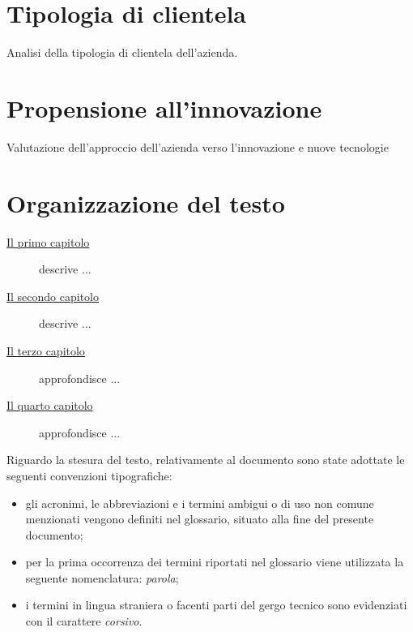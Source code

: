 
\section{Tipologia di clientela}
Analisi della tipologia di clientela dell'azienda.

\section{Propensione all'innovazione}
Valutazione dell'approccio dell'azienda verso l'innovazione e nuove tecnologie

\section{Organizzazione del testo}

\begin{description}
    \item[{\hyperref[cap:introduzione]{Il primo capitolo}}] descrive ...
    \item[{\hyperref[cap:lo-stage]{Il secondo capitolo}}] descrive ...
    
    \item[{\hyperref[cap:descrizione-stage]{Il terzo capitolo}}] approfondisce ...
    
    \item[{\hyperref[cap:conclusioni]{Il quarto capitolo}}] approfondisce ...
    
\end{description}

Riguardo la stesura del testo, relativamente al documento sono state adottate le seguenti convenzioni tipografiche:
\begin{itemize}
	\item gli acronimi, le abbreviazioni e i termini ambigui o di uso non comune menzionati vengono definiti nel glossario, situato alla fine del presente documento;
	\item per la prima occorrenza dei termini riportati nel glossario viene utilizzata la seguente nomenclatura: \emph{parola}\glsfirstoccur;
	\item i termini in lingua straniera o facenti parti del gergo tecnico sono evidenziati con il carattere \emph{corsivo}.
\end{itemize}
